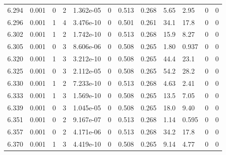 \documentclass[preview]{standalone}
\begin{document}
{{{{{{{{{{{{{{{{{\begin{tabular}{L{1.2cm}C{1.2cm} C{0.3cm}C{0.5cm} C{1.4cm}C{1.4cm} C{1.4cm}C{1.4cm} C{1.6cm}C{1.6cm} C{1.6cm}C{1.6cm}}
  6.294  &  0.001  & 0     &  2 &  1.362e-05  & 0  &  0.513&   0.268& 5.65 & 2.95   &  0 & 0  \\ 
  6.296  &  0.001  & 1     &  4 &  3.476e-10  & 0  &  0.501&   0.261& 34.1 & 17.8   &  0 & 0  \\ 
  6.302  &  0.001  & 1     &  2 &  1.742e-10  & 0  &  0.513&   0.268& 15.9 & 8.27   &  0 & 0  \\ 
  6.305  &  0.001  & 0     &  3 &  8.606e-06  & 0  &  0.508&   0.265& 1.80 & 0.937   &  0 & 0  \\ 
  6.320  &  0.001  & 1     &  3 &  3.212e-10  & 0  &  0.508&   0.265& 44.4 & 23.1   &  0 & 0  \\ 
  6.325  &  0.001  & 0     &  3 &  2.112e-05  & 0  &  0.508&   0.265& 54.2 & 28.2   &  0 & 0  \\ 
  6.330  &  0.001  & 1     &  2 &  7.233e-10  & 0  &  0.513&   0.268& 4.63 & 2.41   &  0 & 0  \\ 
  6.333  &  0.001  & 1     &  3 &  1.569e-10  & 0  &  0.508&   0.265& 13.5 & 7.05   &  0 & 0  \\ 
  6.339  &  0.001  & 0     &  3 &  1.045e-05  & 0  &  0.508&   0.265& 18.0 & 9.40   &  0 & 0  \\ 
  6.351  &  0.001  & 0     &  2 &  9.167e-07  & 0  &  0.513&   0.268& 1.14 & 0.595   &  0 & 0  \\ 
  6.357  &  0.001  & 0     &  2 &  4.171e-06  & 0  &  0.513&   0.268& 34.2 & 17.8   &  0 & 0  \\ 
  6.370  &  0.001  & 1     &  3 &  4.419e-10  & 0  &  0.508&   0.265& 9.14 & 4.77   &  0 & 0  \\ 
\hline 
\end{tabular} 

}}}}}}}}}}}}}}}}}
\end{document}

